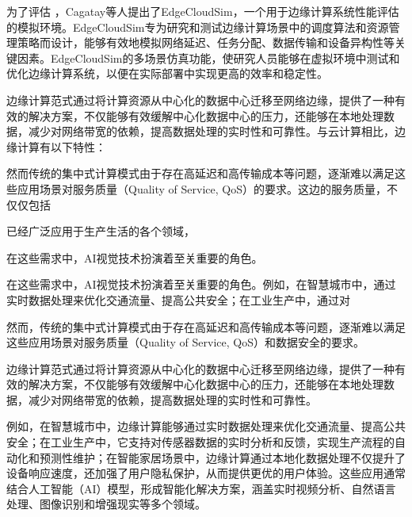 为了评估 ，Cagatay\cite{sonmez2018edgecloudsim}等人提出了EdgeCloudSim，一个用于边缘计算系统性能评估的模拟环境。EdgeCloudSim专为研究和测试边缘计算场景中的调度算法和资源管理策略而设计，能够有效地模拟网络延迟、任务分配、数据传输和设备异构性等关键因素。EdgeCloudSim的多场景仿真功能，使研究人员能够在虚拟环境中测试和优化边缘计算系统，以便在实际部署中实现更高的效率和稳定性。




边缘计算范式通过将计算资源从中心化的数据中心迁移至网络边缘，提供了一种有效的解决方案，不仅能够有效缓解中心化数据中心的压力，还能够在本地处理数据，减少对网络带宽的依赖，提高数据处理的实时性和可靠性\cite{chowdhury2019co,khan2019edge,liu2019survey,施巍松2019边缘计算,刘通2021边缘计算中任务卸载研究综述}。与云计算相比，边缘计算有以下特性：


然而传统的集中式计算模式由于存在高延迟和高传输成本等问题，逐渐难以满足这些应用场景对服务质量（Quality of Service, QoS）的要求。这边的服务质量，不仅仅包括

已经广泛应用于生产生活的各个领域，

在这些需求中，AI视觉技术扮演着至关重要的角色。


在这些需求中，AI视觉技术扮演着至关重要的角色。例如，在智慧城市中，通过实时数据处理来优化交通流量、提高公共安全\cite{lin2016real,jia2017edge,mohamed2017smartcityware,mallapuram2017smart,dalla2017using}；在工业生产中，通过对



然而，传统的集中式计算模式由于存在高延迟和高传输成本等问题，逐渐难以满足这些应用场景对服务质量（Quality of Service, QoS）和数据安全的要求。

边缘计算范式通过将计算资源从中心化的数据中心迁移至网络边缘，提供了一种有效的解决方案，不仅能够有效缓解中心化数据中心的压力，还能够在本地处理数据，减少对网络带宽的依赖，提高数据处理的实时性和可靠性\cite{chowdhury2019co,khan2019edge,liu2019survey,施巍松2019边缘计算,刘通2021边缘计算中任务卸载研究综述}。

例如，在智慧城市中，边缘计算能够通过实时数据处理来优化交通流量、提高公共安全\cite{lin2016real,jia2017edge,mohamed2017smartcityware,mallapuram2017smart,dalla2017using}；在工业生产中，它支持对传感器数据的实时分析和反馈，实现生产流程的自动化和预测性维护\cite{yin2015big,yan2017industrial,zhang2017self,peres2018idarts,mohamed2019leveraging}；在智能家居场景中，边缘计算通过本地化数据处理不仅提升了设备响应速度，还加强了用户隐私保护，从而提供更优的用户体验\cite{savio2018smart,krejcar2020technology,黄倩怡2020智能家居中的边缘计算}。这些应用通常结合人工智能（AI）模型，形成智能化解决方案，涵盖实时视频分析、自然语言处理、图像识别和增强现实等多个领域\cite{deng2020edge,gill2025edge}。


